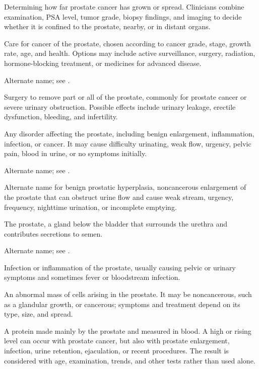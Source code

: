  Determining how far prostate cancer has grown or spread. Clinicians combine examination, PSA level, tumor grade, biopsy findings, and imaging to decide whether it is confined to the prostate, nearby, or in distant organs.

 Care for cancer of the prostate, chosen according to cancer grade, stage, growth rate, age, and health. Options may include active surveillance, surgery, radiation, hormone-blocking treatment, or medicines for advanced disease.

 Alternate name; see .

 Surgery to remove part or all of the prostate, commonly for prostate cancer or severe urinary obstruction. Possible effects include urinary leakage, erectile dysfunction, bleeding, and infertility.

 Any disorder affecting the prostate, including benign enlargement, inflammation, infection, or cancer. It may cause difficulty urinating, weak flow, urgency, pelvic pain, blood in urine, or no symptoms initially.

 Alternate name; see .

 Alternate name for benign prostatic hyperplasia, noncancerous enlargement of the prostate that can obstruct urine flow and cause weak stream, urgency, frequency, nighttime urination, or incomplete emptying.

 The prostate, a gland below the bladder that surrounds the urethra and contributes secretions to semen.

 Alternate name; see .

 Infection or inflammation of the prostate, usually causing pelvic or urinary symptoms and sometimes fever or bloodstream infection.

 An abnormal mass of cells arising in the prostate. It may be noncancerous, such as a glandular growth, or cancerous; symptoms and treatment depend on its type, size, and spread.

 A protein made mainly by the prostate and measured in blood. A high or rising level can occur with prostate cancer, but also with prostate enlargement, infection, urine retention, ejaculation, or recent procedures. The result is considered with age, examination, trends, and other tests rather than used alone.


